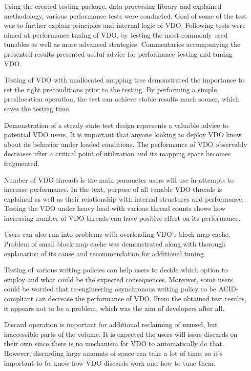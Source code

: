 \documentclass[
  color, %
  table, %
  lof,   %
  lot,   %
]{fithesis3}
\begin{document}
Using the created testing package, data processing library and explained methodology, various performance tests were conducted. Goal of some of the test was to further explain principles and internal logic of VDO. Following tests were aimed at performance tuning of VDO, by testing the most commonly used tunables as well as more advanced strategies. Commentaries accompanying the presented results presented useful advice for performance testing and tuning VDO.

Testing of VDO with unallocated mapping tree demonstrated the importance to set the right preconditions prior to the testing. By performing a simple preallocation operation, the test can achieve stable results much sooner, which saves the testing time.

Demonstration of a steady state test design represents a valuable advice to potential VDO users. It is important that anyone looking to deploy VDO know about its behavior under loaded conditions. The performance of VDO observably decreases after a critical point of utilization and its mapping space becomes fragmented.

Number of VDO threads is the main parameter users will use in attempts to increase performance. In the text, purpose of all tunable VDO threads is explained as well as their relationship with internal structures and performance. Testing the VDO under heavy load with various thread counts shows how increasing number of VDO threads can have positive effect on its performance.

Users can also run into problems with overloading VDO's block map cache. Problem of small block map cache was demonstrated along with thorough explanation of its cause and recommendation for additional tuning.

Testing of various writing policies can help users to decide which option to employ and what could be the expected consequences. Moreover, some users could be worried that re-engineering asynchronous writing policy to be ACID-compliant can decrease the performance of VDO. From the obtained test results, it appears not to be a problem, which was the aim of developers after all.


Discard operation is important for additional reclaiming of unused, but inaccessible parts of the volume. It is expected the users will issue discards on their own since there is no mechanism for VDO to automatically do that. However, discarding large amounts of space can take a lot of time, so it's important to be know how VDO discards work and how to tune them.
\end{document}
